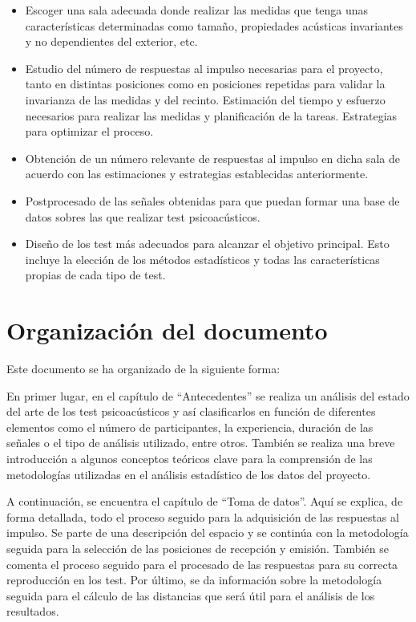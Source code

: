 \documentclass[11pt,a4paper]{book}
\begin{document}
        \begin{itemize}
            \item Escoger una sala adecuada donde realizar las medidas que tenga unas características determinadas como tamaño, propiedades acústicas invariantes y no dependientes del exterior, etc.
            \item Estudio del número de respuestas al impulso necesarias para el proyecto, tanto en distintas posiciones como en posiciones repetidas para validar la invarianza de las medidas y del recinto. Estimación del tiempo y esfuerzo necesarios para realizar las medidas y planificación de la tareas. Estrategias para optimizar el proceso.
            \item Obtención de un número relevante de respuestas al impulso en dicha sala de acuerdo con las estimaciones y estrategias establecidas anteriormente.
            \item Postprocesado de las señales obtenidas para que puedan formar una base de datos sobres las que realizar test psicoacústicos.
            \item Diseño de los test más adecuados para alcanzar el objetivo principal. Esto incluye la elección de los métodos estadísticos y todas las características propias de cada tipo de test.
      
        \end{itemize}
        
    \section{Organización del documento}
        Este documento se ha organizado de la siguiente forma:
        
        En primer lugar, en el capítulo de ``Antecedentes'' se realiza un análisis del estado del arte de los test psicoacústicos y así clasificarlos en función de diferentes elementos como el número de participantes, la experiencia, duración de las señales o el tipo de análisis utilizado, entre otros. También se realiza una breve introducción a algunos conceptos teóricos clave para la comprensión de las metodologías utilizadas en el análisis estadístico de los datos del proyecto.
        
        A continuación, se encuentra el capítulo de ``Toma de datos''. Aquí se explica, de forma detallada, todo el proceso seguido para la adquisición de las respuestas al impulso. Se parte de una descripción del espacio y se continúa con la metodología seguida para la selección de las posiciones de recepción y emisión. También se comenta el proceso seguido para el procesado de las respuestas para su correcta reproducción en los test. Por último, se da información sobre la metodología seguida para el cálculo de las distancias que será útil para el análisis de los resultados.
        
\end{document}
